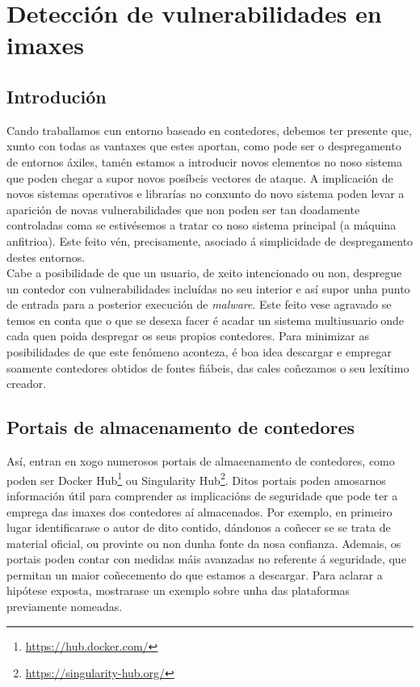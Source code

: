 \chapter{Detección de vulnerabilidades en imaxes}
\minitoc
\clearpage

\section{Introdución}

Cando traballamos cun entorno baseado en contedores, debemos ter presente que, xunto con todas as vantaxes que estes aportan, como pode ser o despregamento de entornos áxiles, tamén estamos a introducir novos elementos no noso sistema que poden chegar a supor novos posíbeis vectores de ataque. A implicación de novos sistemas operativos e librarías no conxunto do novo sistema poden levar a aparición de novas vulnerabilidades que non poden ser tan doadamente controladas coma se estivésemos a tratar co noso sistema principal (a máquina anfitrioa). Este feito vén, precisamente, asociado á simplicidade de despregamento destes entornos.\\

Cabe a posibilidade de que un usuario, de xeito intencionado ou non, despregue un contedor con vulnerabilidades incluídas no seu interior e así supor unha punto de entrada para a posterior execución de \textit{malware}. Este feito vese agravado se temos en conta que o que se desexa facer é acadar un sistema multiusuario onde cada quen poida despregar os seus propios contedores. Para minimizar as posibilidades de que este fenómeno aconteza, é boa idea descargar e empregar soamente contedores obtidos de fontes fiábeis, das cales coñezamos o seu lexítimo creador.

\section{Portais de almacenamento de contedores}

Así, entran en xogo numerosos portais de almacenamento de contedores, como poden ser Docker Hub\footnote{\url{https://hub.docker.com/}} ou Singularity Hub\footnote{\url{https://singularity-hub.org/}}. Ditos portais poden amosarnos información útil para comprender as implicacións de seguridade que pode ter a emprega das imaxes dos contedores aí almacenados. Por exemplo, en primeiro lugar identificarase o autor de dito contido, dándonos a coñecer se se trata de material oficial, ou provinte ou non dunha fonte da nosa confianza. Ademais, os portais poden contar con medidas máis avanzadas no referente á seguridade, que permitan un maior coñecemento do que estamos a descargar. Para aclarar a hipótese exposta, mostrarase un exemplo sobre unha das plataformas previamente nomeadas.\\

